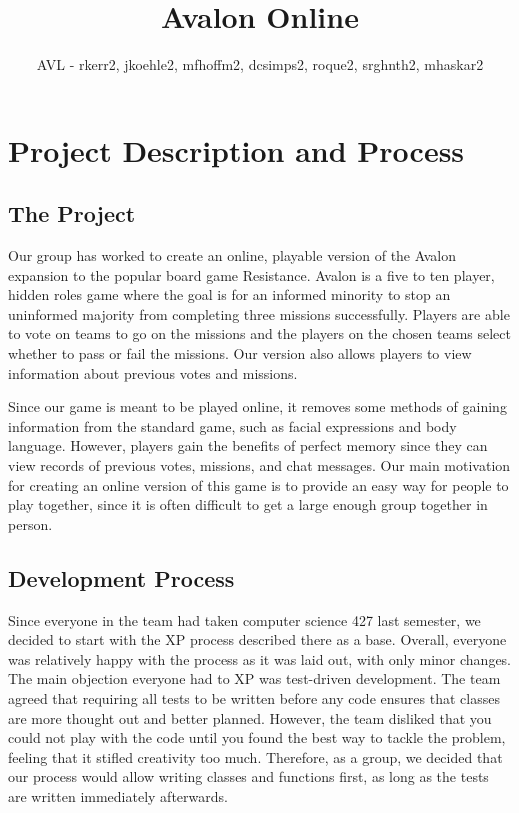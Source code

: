 \documentclass{hitec}
\author{AVL - rkerr2, jkoehle2, mfhoffm2, dcsimps2, roque2, srghnth2, mhaskar2}
\title{Avalon Online}
\begin{document}
\maketitle


\tableofcontents

\section{Project Description and Process}
\subsection{The Project}
Our group has worked to create an online, playable version of the Avalon expansion to the popular board game Resistance. Avalon is a five to ten player, hidden roles game where the goal is for an informed minority to stop an uninformed majority from completing three missions successfully. Players are able to vote on teams to go on the missions and the players on the chosen teams select whether to pass or fail the missions. Our version also allows players to view information about previous votes and missions.

Since our game is meant to be played online, it removes some methods of gaining information from the standard game, such as facial expressions and body language. However, players gain the benefits of perfect memory since they can view records of previous votes, missions, and chat messages. Our main motivation for creating an online version of this game is to provide an easy way for people to play together, since it is often difficult to get a large enough group together in person.

\subsection{Development Process}
Since everyone in the team had taken computer science 427 last semester, we decided to start with the XP process described there as a base. Overall, everyone was relatively happy with the process as it was laid out, with only minor changes. The main objection everyone had to XP was test-driven development. The team agreed that requiring all tests to be written before any code ensures that classes are more thought out and better planned. However, the team disliked that you could not play with the code until you found the best way to tackle the problem, feeling that it stifled creativity too much. Therefore, as a group, we decided that our process would allow writing classes and functions first, as long as the tests are written immediately afterwards.
\end{document}
